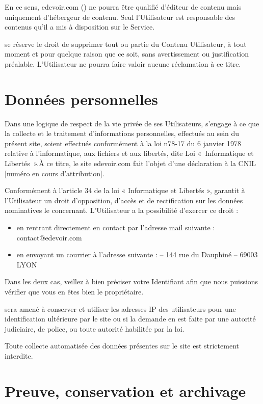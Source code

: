En ce sens, edevoir.com (\eDevoir) ne pourra être qualifié d'éditeur de contenu mais uniquement d'hébergeur de contenu. Seul l'Utilisateur est responsable des contenus qu'il a mis à disposition sur le Service.

\eDevoir se réserve le droit de supprimer tout ou partie du Contenu Utilisateur, à tout moment et pour quelque raison que ce soit, sans avertissement ou justification préalable. L'Utilisateur ne pourra faire valoir aucune réclamation à ce titre. 


\section{Données personnelles}

Dans une logique de respect de la vie privée de ses Utilisateurs, \eDevoir s'engage à ce que la collecte et le traitement d'informations personnelles, effectués au sein du présent site, soient effectués conformément à la loi n78-17 du 6 janvier 1978 relative à l'informatique, aux fichiers et aux libertés, dite Loi «~Informatique et Libertés~».À ce titre, le site edevoir.com fait l'objet d'une déclaration à la CNIL [numéro en cours d'attribution].

Conformément à l'article 34 de la loi « Informatique et Libertés », \eDevoir garantit à l'Utilisateur un droit d'opposition, d'accès et de rectification sur les données nominatives le concernant. L'Utilisateur a la possibilité d'exercer ce droit :
\begin{itemize}
   \item en rentrant directement en contact par l'adresse mail suivante : contact@edevoir.com
   \item en envoyant un courrier à l'adresse suivante : \eDevoir -- 144 rue du Dauphiné -- 69003 LYON
\end{itemize}
 Dans les deux cas, veillez à bien préciser votre Identifiant afin que nous puissions vérifier que vous en êtes bien le propriétaire.

\eDevoir sera amené à conserver et utiliser les adresses IP des utilisateurs pour une identification ultérieure par le site ou si la demande en est faite par  une autorité judiciaire, de police, ou toute autorité habilitée par la loi.

Toute collecte automatisée des données présentes sur le site est strictement interdite.


\section{Preuve, conservation et archivage}

